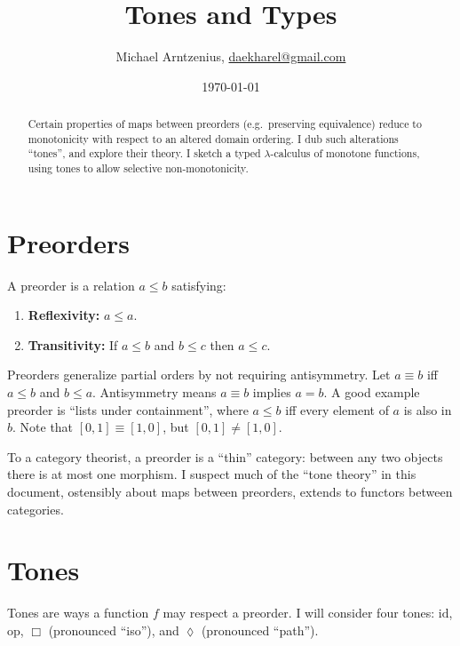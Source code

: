 \documentclass[ribbons]{rntz}
\title{Tones and Types}
\author{Michael Arntzenius, %
  \href{mailto:daekharel@gmail.com}{daekharel@gmail.com}}
\date{\today}
\newcommand{\id}{\ensuremath{\textrm{id}}}
\newcommand{\op}{\ensuremath{\textrm{op}}}
\newcommand{\iso}{\ensuremath{\textrm{iso}}}     %
\renewcommand{\path}{\ensuremath{\textrm{path}}} %
\renewcommand{\iso}{\texorpdfstring{\ensuremath{\Box}}{iso}}
\renewcommand{\path}{\texorpdfstring{\ensuremath{\lozenge}}{path}}
\newcommand{\tm}{\id}                        %
\newcommand{\ta}{{\color{ForestGreen}\op}}   %
\newcommand{\ti}{{\color{NavyBlue}\iso}}     %
\newcommand{\tb}{{\color{Bittersweet}\path}} %
\begin{document}
\maketitle

\begin{abstract}
 Certain properties of maps between preorders (e.g.\ preserving equivalence)
 reduce to monotonicity with respect to an altered domain ordering. I dub such
 alterations ``tones'', and explore their theory. I sketch a typed
 $\lambda$-calculus of monotone functions, using tones to allow selective
 non-mono\-tonicity.
\end{abstract}

\section{Preorders}

A preorder is a relation $a \le b$ satisfying:
\begin{enumerate}
\item \textbf{Reflexivity:} $a \le a$.
\item \textbf{Transitivity:} If $a \le b$ and $b \le c$ then $a \le c$.
\end{enumerate}

Preorders generalize partial orders by not requiring antisymmetry. Let
$a \equiv b$ iff $a \le b$ and $b \le a$. Antisymmetry means $a \equiv b$
implies $a = b$.
%
A good example preorder is ``lists under containment'', where $a \le b$ iff
every element of $a$ is also in $b$. Note that $[0,1] \equiv [1,0]$, but $[0,1]
\ne [1,0]$.

To a category theorist, a preorder is a ``thin'' category: between any two
objects there is at most one morphism. I suspect much of the ``tone theory'' in
this document, ostensibly about maps between preorders, extends to functors
between categories.


\section{Tones}\label{sec:tones}

Tones are ways a function $f$ may respect a preorder. I will consider four
tones: \tm, \ta, \ti{} (pronounced ``iso''), and \tb{} (pronounced ``path'').
\end{document}
